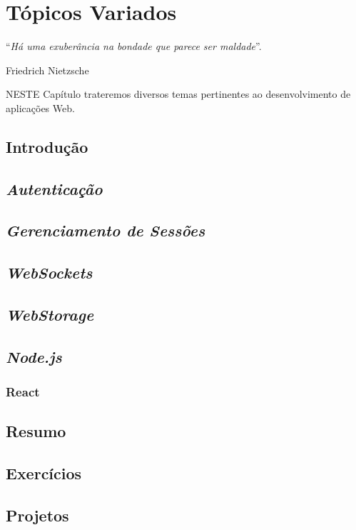 \chapter{Tópicos Variados}\label{cap:topicosVariados}
\epigraph{``\textit{Há uma exuberância na bondade que parece ser maldade}''.}{Friedrich Nietzsche}

\lettrine[lines=4, lhang=0.1, lraise=0, loversize=0.2, findent=0.1em]{\textcolor{corAzulTema}{N}}{ESTE} Capítulo trateremos diversos temas pertinentes ao desenvolvimento de aplicações Web.

\vfill

\section{Introdução}

\section{\textit{Autenticação}}

\section{\textit{Gerenciamento de Sessões}}

\section{\textit{WebSockets}}

\section{\textit{WebStorage}}

\section{\textit{Node.js}}

\subsection{React}

\section{Resumo}

\section{Exercícios}

\section{Projetos}
